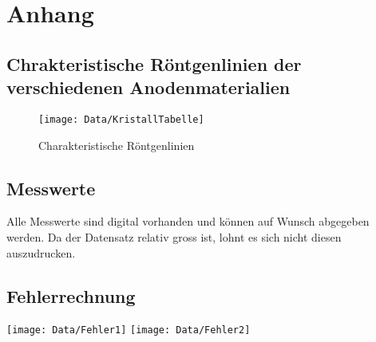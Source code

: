 \section{Anhang}

\subsection{Chrakteristische R\"ontgenlinien der verschiedenen Anodenmaterialien}

\begin{figure}[htbp]
	\centering
	\texttt{[image: Data/KristallTabelle]}
	\caption[Chrakteristische R\"ontgenlinien \cite{Labor_Skript}]{Charakteristische R\"ontgenlinien}
	\label{fig:kristallTabelle}
\end{figure}

\subsection{Messwerte}

Alle Messwerte sind digital vorhanden und k\"onnen auf Wunsch abgegeben werden. Da der Datensatz relativ gross ist, lohnt es sich nicht diesen auszudrucken.

\subsection{Fehlerrechnung}
\centering
\texttt{[image: Data/Fehler1]}
\texttt{[image: Data/Fehler2]}
